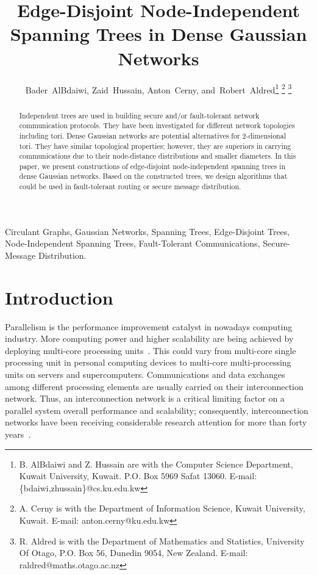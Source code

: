 \documentclass[12pt,journal,compsoc,onecolumn,]{IEEEtran}
\begin{document}
\title{Edge-Disjoint Node-Independent Spanning Trees in Dense Gaussian Networks}

\author{Bader~AlBdaiwi,
        Zaid~Hussain,
        Anton~Cerny,
        and~Robert~Aldred\thanks{B. AlBdaiwi and Z. Hussain are with the Computer Science Department, Kuwait University, Kuwait. P.O. Box 5969 Safat 13060. E-mail: \{bdaiwi,zhussain\}@cs.ku.edu.kw}
\thanks{A. Cerny is with the Department of Information Science, Kuwait University, Kuwait.
E-mail: anton.cerny@ku.edu.kw}
\thanks{R. Aldred is with the Department of Mathematics and Statistics, University Of Otago, P.O. Box 56, Dunedin 9054, New Zealand. E-mail: raldred@maths.otago.ac.nz}}
\maketitle
\begin{abstract}
Independent trees are used in building secure and/or fault-tolerant network communication protocols.
They have been investigated for different network topologies including tori.
Dense Gaussian networks are potential alternatives for 2-dimensional tori.
They have similar topological properties; however,
they are superiors in carrying communications
due to their node-distance distributions and smaller diameters.
In this paper, we present constructions of edge-disjoint node-independent spanning trees in dense Gaussian networks.
Based on the constructed trees, we design algorithms that could be used in fault-tolerant routing or secure message distribution.
\end{abstract}


\begin{IEEEkeywords}
Circulant Graphs, Gaussian Networks, Spanning Trees, Edge-Disjoint Trees, Node-Independent Spanning Trees,
Fault-Tolerant Communications, Secure-Message Distribution.
\end{IEEEkeywords}









\section{Introduction}\label{sec:introduction}
Parallelism is the performance improvement catalyst in nowadays computing
industry. More computing power and higher scalability are being achieved by
deploying multi-core processing units~\cite{williams2009roofline}. This
could vary from multi-core single processing unit in personal computing
devices to multi-core multi-processing units on servers and supercomputers.
Communications and data exchanges among different processing elements are
usually carried on their interconnection network. Thus, an interconnection
network is a critical limiting factor on a parallel system overall performance
and scalability; consequently, interconnection networks have been receiving considerable research
attention for more than forty years~\cite{dally2004principles}.
\end{document}
